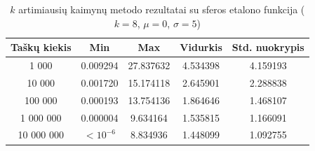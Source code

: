 \begin{table}[H]
    \centering
    \begin{tabular}{|c|c|c|c|c|}
        \hline
        \textbf{Taškų kiekis} & \textbf{Min} & \textbf{Max} & \textbf{Vidurkis} & \textbf{Std. nuokrypis} \\ \hline
        1 000        & 0.009294 & 27.837632 & 4.534398 & 4.159193 \\ \hline
        10 000       & 0.001720 & 15.174118 & 2.645901 & 2.288838 \\ \hline
        100 000      & 0.000193 & 13.754136 & 1.864646 & 1.468107 \\ \hline
        1 000 000    & 0.000004 & 9.634164 & 1.535815 & 1.166091 \\ \hline
        10 000 000   & $<10^{-6}$ & 8.834936 & 1.448099 & 1.092755 \\ \hline
    \end{tabular}
    \caption{$k$ artimiausių kaimynų metodo rezultatai su sferos etalono funkcija ($k = 8$, $\mu = 0$, $\sigma = 5$)}
\end{table}